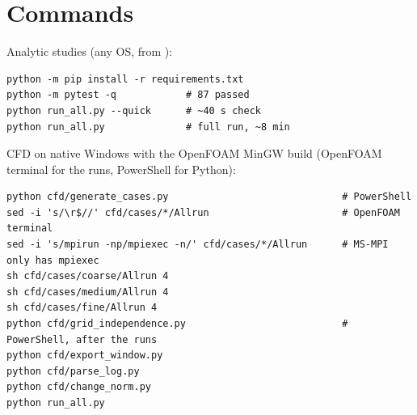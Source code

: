 \section{Commands}
Analytic studies (any OS, from ):
\begin{lstlisting}
python -m pip install -r requirements.txt
python -m pytest -q            # 87 passed
python run_all.py --quick      # ~40 s check
python run_all.py              # full run, ~8 min
\end{lstlisting}
CFD on native Windows with the OpenFOAM MinGW build (OpenFOAM terminal for the runs, PowerShell for Python):
\begin{lstlisting}
python cfd/generate_cases.py                              # PowerShell
sed -i 's/\r$//' cfd/cases/*/Allrun                       # OpenFOAM terminal
sed -i 's/mpirun -np/mpiexec -n/' cfd/cases/*/Allrun      # MS-MPI only has mpiexec
sh cfd/cases/coarse/Allrun 4
sh cfd/cases/medium/Allrun 4
sh cfd/cases/fine/Allrun 4
python cfd/grid_independence.py                           # PowerShell, after the runs
python cfd/export_window.py
python cfd/parse_log.py
python cfd/change_norm.py
python run_all.py
\end{lstlisting}

